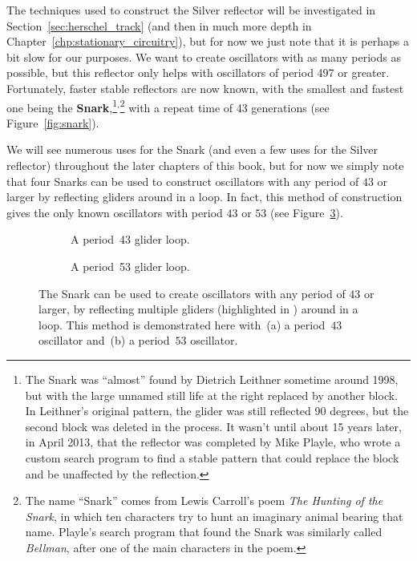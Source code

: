 The techniques used to construct the Silver reflector will be investigated in Section~\ref{sec:herschel_track} (and then in much more depth in Chapter~\ref{chp:stationary_circuitry}), but for now we just note that it is perhaps a bit slow for our purposes. We want to create oscillators with as many periods as possible, but this reflector only helps with oscillators of period 497 or greater. Fortunately, faster stable reflectors are now known, with the smallest and fastest one being the \textbf{Snark},\footnote{The Snark was ``almost'' found by Dietrich Leithner sometime around 1998, but with the large unnamed still life at the right replaced by another block. In Leithner's original pattern, the glider was still reflected 90 degrees, but the second block was deleted in the process. It wasn't until about 15 years later, in April 2013, that the reflector was completed by Mike Playle, who wrote a custom search program to find a stable pattern that could replace the block and be unaffected by the reflection.}$^{,}$\footnote{The name ``Snark'' comes from Lewis Carroll's poem \emph{The Hunting of the Snark}, in which ten characters try to hunt an imaginary animal bearing that name. Playle's search program that found the Snark was similarly called \emph{Bellman}, after one of the main characters in the poem.} with a repeat time of 43 generations (see Figure~\ref{fig:snark}).

We will see numerous uses for the Snark (and even a few uses for the Silver reflector) throughout the later chapters of this book, but for now we simply note that four Snarks can be used to construct oscillators with any period of $43$ or larger by reflecting gliders around in a loop. In fact, this method of construction gives the only known oscillators with period $43$ or $53$ (see Figure~\ref{fig:period_43_53}).

\begin{figure}[!htb]
	\centering
	\begin{subfigure}{.5\textwidth}
		\centering
		\caption{A period~43 glider loop.}
		\label{fig:period_43}
	\end{subfigure}%
	\begin{subfigure}{.5\textwidth}
		\centering
		\caption{A period~53 glider loop.}
		\label{fig:period_53}
	\end{subfigure}
	\caption{The Snark can be used to create oscillators with any period of $43$ or larger, by reflecting multiple gliders (highlighted in ) around in a loop. This method is demonstrated here with~(a) a period~$43$ oscillator and~(b) a period~$53$ oscillator.}
	\label{fig:period_43_53}
\end{figure}


